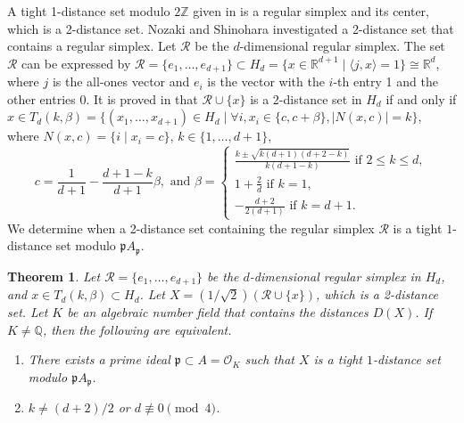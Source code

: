 \documentclass[a4paper, 11pt]{article}
\newcommand{\R}{\mathbb{R}}
\newcommand{\Q}{\mathbb{Q}}
\newcommand{\p}{\mathfrak{p}}
\newcommand{\Oc}{\mathcal{O}}
\newcommand{\la}{\langle}
\newcommand{\ra}{\rangle}
\newtheorem{theorem}{Theorem}[section]
\theoremstyle{definition}
\begin{document}
A tight 1-distance set modulo $2\mathbb{Z}$ given in \cite{GRS74,R97} is a regular simplex and its center, which is a 2-distance set. 
Nozaki and Shinohara \cite{NS20} investigated a 2-distance set that contains a regular simplex. 
Let $\mathcal{R}$ be the $d$-dimensional regular simplex. 
The set $\mathcal{R}$ can be expressed by $\mathcal{R}=\{e_1,\ldots, e_{d+1}\} \subset H_d=\{x \in \R^{d+1} \mid \la j, x \ra =1\} \cong \mathbb{R}^d$, where $j$ is the all-ones vector and $e_i$ is the vector with the $i$-th entry 1 and the other entries 0.  
It is proved in \cite{NS20} that $\mathcal{R}\cup \{x\}$ is a 2-distance set in $H_d$ if and only if $x \in T_d(k,\beta)=\{(x_1,\ldots,x_{d+1}) \in H_d \mid \forall i, x_i \in \{c, c+\beta\},|N(x,c)|=k \}$, where $N(x,c)=\{i \mid x_i=c\}$, $k \in \{1,\ldots, d+1\}$,  
\[
c=\frac{1}{d+1}-\frac{d+1-k}{d+1} \beta, \text{ and } 
\beta=\begin{cases}
\frac{k\pm \sqrt{k(d+1)(d+2-k)}}{k(d+1-k)} \text{ if $2\leq k \leq d$},\\
1+\frac{2}{d} \text{ if $k=1$}, \\ 
-\frac{d+2}{2(d+1)} \text{ if $k=d+1$}. 
\end{cases}
\]
We determine when a 2-distance set containing the regular simplex $\mathcal{R}$ is a tight $1$-distance set modulo $\p A_\p$. 
\begin{theorem} \label{thm:4.7}
Let $\mathcal{R}=\{e_1,\ldots, e_{d+1}\}$ be the $d$-dimensional regular simplex in $H_d$, and $x \in T_d(k,\beta)\subset H_d$.  
Let $X=(1/\sqrt{2})(\mathcal{R} \cup \{x\})$, which is a 2-distance set. 
Let $K$ be an algebraic number field that contains the distances $D(X)$. 
If $K\ne \Q$,  
then the following are equivalent.  
\begin{enumerate}
    \item There exists a prime ideal $\p \subset A=\Oc_K$ such that $X$ is a tight $1$-distance set modulo $\p A_\p$. 
    \item $k\ne (d+2)/2$ or $d \not \equiv 0 \pmod{4}$. 
\end{enumerate}
\end{theorem}
\end{document}
